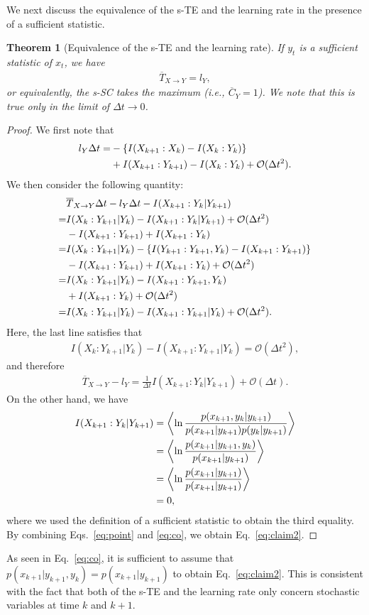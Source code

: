 \documentclass[%
 reprint,
 amsmath,amssymb,
 aps,
]{revtex4-1}
\newcommand{\balign}[1]{\begin{align} #1 \end{align}}
\newcommand{\eref}[1]{Eq.~\eqref{#1}}
\newcommand\str{\overline{T}_{X\to Y}}
\theoremstyle{plain}
\newtheorem{thm}{Theorem}
\begin{document}
We next discuss the equivalence of the s-TE and the learning rate in the presence of a sufficient statistic.
\begin{thm}[Equivalence of the s-TE and the learning rate]
{\rm If $y_t$ is a sufficient statistic of $x_t$, we have}
\balign{
\str=l_{Y}, \label{eq:claim2}
}
{\rm or equivalently, the s-SC takes the maximum (i.e., $\overline{C}_Y=1$). We note that this is true only in the limit of $\Delta t \to 0$.}
\end{thm}
\begin{proof}
We first note that 
\balign{
l_Y\Delta t=&-\left\{I(X_{k+1}:X_k)-I(X_k:Y_k)\right\} \notag\\
&+I(X_{k+1}:Y_{k+1})-I(X_k:Y_k)+\mathcal{O}(\Delta t^2).
}
We then consider the following quantity:
\balign{
&\str\Delta t-l_Y\Delta t-I(X_{k+1}:Y_k|Y_{k+1}) \notag\\
=&I(X_k:Y_{k+1}|Y_k)-I(X_{k+1}:Y_k|Y_{k+1})+\mathcal{O}(\Delta t^2) \notag\\
 &-I(X_{k+1}:Y_{k+1})+I(X_{k+1}:Y_k) \notag\\
=&I(X_k:Y_{k+1}|Y_k)-\left\{I(Y_{k+1}:Y_{k+1},Y_k)-I(X_{k+1}:Y_{k+1})\right\} \notag\\
& -I(X_{k+1}:Y_{k+1})+I(X_{k+1}:Y_k)+\mathcal{O}(\Delta t^2)\notag\\
=&I(X_k:Y_{k+1}|Y_k)-I(X_{k+1}:Y_{k+1},Y_k) \notag \\
&+I(X_{k+1}:Y_k)+\mathcal{O}(\Delta t^2)\notag\\
=&I(X_k:Y_{k+1}|Y_k)-I(X_{k+1}:Y_{k+1}|Y_k)+\mathcal{O}(\Delta t^2). 
}
Here, the last line satisfies that~\cite{Ito2013,Ito2016,Hartich2014}
\balign{
I(X_k:Y_{k+1}|Y_k)-I(X_{k+1}:Y_{k+1}|Y_k)=\mathcal{O}(\Delta t^2), \label{eq:point2}
}
and therefore
\balign{
\str-l_{Y}=\frac{1}{\Delta t}I(X_{k+1}:Y_k|Y_{k+1})+\mathcal{O}(\Delta t).  \label{eq:point}
}
On the other hand, we have
\balign{
I(X_{k+1}:Y_k|Y_{k+1})&=\left< \ln\frac{p(x_{k+1},y_k|y_{k+1})}{p(x_{k+1}|y_{k+1})p(y_k|y_{k+1})} \right> \notag \\
&=\left< \ln \frac{p(x_{k+1}|y_{k+1},y_k)}{p(x_{k+1}|y_{k+1})} \right> \notag \\
&=\left< \ln \frac{p(x_{k+1}|y_{k+1})}{p(x_{k+1}|y_{k+1})} \right> \notag \\
&=0, \label{eq:co}
}
where we used the definition of a sufficient statistic to obtain the third equality.
By combining Eqs.~\eqref{eq:point} and \eqref{eq:co}, we obtain \eref{eq:claim2}.
\end{proof}
As seen in \eref{eq:co}, it is sufficient to assume that $p(x_{k+1}|y_{k+1},y_k)=p(x_{k+1}|y_{k+1})$ to obtain \eref{eq:claim2}.  This is consistent with the fact that both of the s-TE and the learning rate only concern stochastic variables at time $k$ and $k+1$. 
\end{document}
